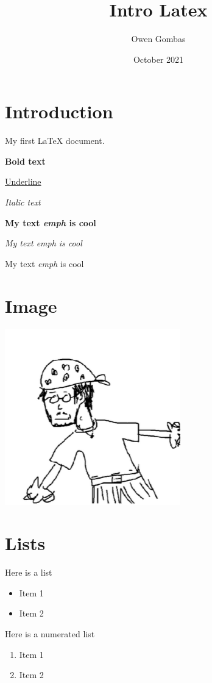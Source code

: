 \documentclass{article}
\title{Intro Latex}
\author{Owen Gombas}
\date{October 2021}
\begin{document}
\maketitle
\tableofcontents

\section{Introduction}

My first \LaTeX{} document.


\textbf{Bold text}

\underline{Underline}

\textit{Italic text}

\textbf{My text \emph{emph} is cool}

\textit{My text \emph{emph} is cool}

My text \emph{emph} is cool

\section{Image}
\includegraphics{ven.png}

\section{Lists}
Here is a list
\begin{itemize}
  \item Item 1
  \item Item 2
\end{itemize}

Here is a numerated list
\begin{enumerate}
  \item Item 1
  \item Item 2
\end{enumerate}
\end{document}
